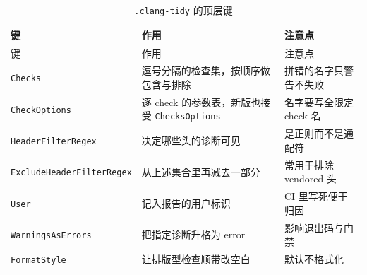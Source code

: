 \documentclass[12pt,a4paper,fontset=fandol]{ctexbook}
\begin{document}
{\footnotesize
\begin{longtable}{@{}>{\raggedright\arraybackslash}p{}
                  >{\raggedright\arraybackslash}p{}
                  >{\raggedright\arraybackslash}p{}@{}}
\caption{\texttt{.clang-tidy} 的顶层键}\label{tab:appA-top}\\
\toprule
键 & 作用 & 注意点 \\
\midrule
\endfirsthead
\toprule
键 & 作用 & 注意点 \\
\midrule
\endhead
\bottomrule
\endlastfoot
\texttt{Checks} & 逗号分隔的检查集，按顺序做包含与排除 & 拼错的名字只警告不失败 \\
\texttt{CheckOptions} & 逐 check 的参数表，新版也接受 \texttt{ChecksOptions} & 名字要写全限定 check 名 \\
\texttt{HeaderFilterRegex} & 决定哪些头的诊断可见 & 是正则而不是通配符 \\
\texttt{ExcludeHeader\allowbreak FilterRegex} & 从上述集合里再减去一部分 & 常用于排除 vendored 头 \\
\texttt{User} & 记入报告的用户标识 & CI 里写死便于归因 \\
\texttt{WarningsAsErrors} & 把指定诊断升格为 error & 影响退出码与门禁 \\
\texttt{FormatStyle} & 让排版型检查顺带改空白 & 默认不格式化 \\
\end{longtable}
}
\end{document}
